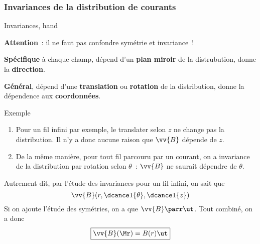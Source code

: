 \documentclass[../main/main.tex]{subfiles}
\begin{document}
\subsubsection{Invariances de la distribution de courants}
\label{sssec:invdist}
\begin{tror}{Invariances, hand}
  \begin{center}
    \vspace{12pt}
    \smallbreak
    \textbf{Attention}~: il ne faut pas confondre symétrie et invariance~!
  \end{center}
  \begin{minipage}[]{.45\linewidth}
    \begin{center}
    \end{center}
    \textbf{Spécifique} à chaque champ, dépend d'un \textbf{plan miroir} de la
    distrubution, donne la \textbf{direction}.
  \end{minipage}
  \hfill
  \begin{minipage}[]{.45\linewidth}
    \begin{center}
    \end{center}
    \textbf{Général}, dépend d'une \textbf{translation} ou \textbf{rotation} de
    la distribution, donne la dépendence aux \textbf{coordonnées}.
  \end{minipage}
\end{tror}

\begin{rexem}{Exemple}
  \begin{enumerate}
    \item Pour un fil infini par exemple, le translater selon $z$ ne change pas
      la distribution. Il n'y a donc aucune raison que $\vv{B}$ dépende de $z$.
    \item De la même manière, pour tout fil parcouru par un courant, on a
      invariance de la distribution par rotation selon $\theta$~: $\vv{B}$ ne
      saurait dépendre de $\theta$.
  \end{enumerate}
  Autrement dit, par l'étude des invariances pour un fil infini, on
  sait que
  \[
    \vv{B}(r,\dcancel{\theta},\dcancel{z})
  \]
  Si on ajoute l'étude des symétries, on a que $\vv{B}\parr \ut$. Tout combiné,
  on a donc
  \[
    \boxed{\vv{B}(\Mr) = B(r)\ut}
  \]
\end{rexem}
\end{document}
